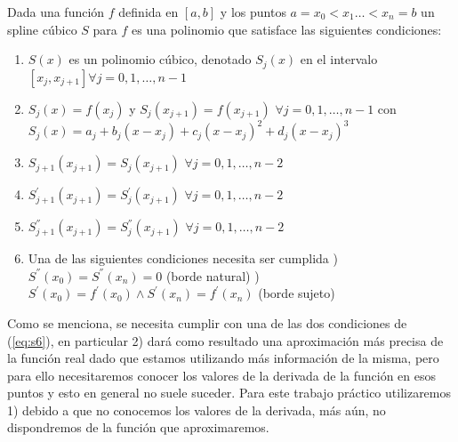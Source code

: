 Dada una función $f$ definida en $[a, b]$ y los puntos $a = x_0 < x_1 \dots < x_n = b$ un spline cúbico $S$ para $f$ es una polinomio que satisface las siguientes condiciones:

\begin{enumerate}
\item $S(x)$ es un polinomio cúbico, denotado $S_j(x)$ en el intervalo $[x_j, x_{j+1}] \forall j = 0, 1, \dots, n-1$ \label{eq:s1}
\item $S_j(x) = f(x_j)$ y $S_j(x_{j+1}) = f(x_{j+1})$ $\forall j = 0, 1, \dots, n-1$ con $S_j(x) = a_j + b_j(x - x_j) + c_j(x - x_j)^2 + d_j(x - x_j)^3$ \label{eq:s2}
\item $S_{j+1}(x_{j+1}) = S_j(x_{j+1})$ $\forall j = 0, 1, \dots, n-2$ \label{eq:s3}
\item $S_{j+1}^{'}(x_{j+1}) = S_j^{'}(x_{j+1})$ $\forall j = 0, 1, \dots, n-2$ \label{eq:s4}
\item $S_{j+1}^{''}(x_{j+1}) = S_j^{''}(x_{j+1})$ $\forall j = 0, 1, \dots, n-2$ \label{eq:s5}
\item Una de las siguientes condiciones necesita ser cumplida \label{eq:s6}
) $S^{''}(x_0) = S^{''}(x_n) = 0$ (borde natural) 
) $S^{'}(x_0) =  f^{'}(x_0) \wedge S^{'}(x_n) = f^{'}(x_n)$ (borde sujeto) 
\end{enumerate}

Como se menciona, se necesita cumplir con una de las dos condiciones de (\ref{eq:s6}), en particular 2) dará como resultado una aproximación más precisa de la función real dado que estamos utilizando más información de la misma, pero para ello necesitaremos conocer los valores de la derivada de la función en esos puntos y esto en general no suele suceder. Para este trabajo práctico utilizaremos 1) debido a que no conocemos los valores de la derivada, más aún, no dispondremos de la función que aproximaremos.








